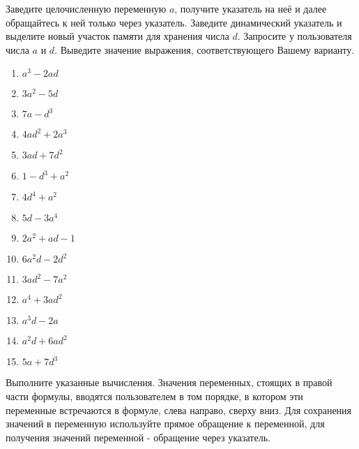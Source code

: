 
\labtask

Заведите целочисленную переменную $a$, получите указатель на неё и далее обращайтесь к ней только через указатель.
Заведите динамический указатель и выделите новый участок памяти для хранения числа $d$.
Запросите у пользователя числа $a$ и $d$.
Выведите значение выражения, соответствующего Вашему варианту.

\begin{enumerate}

\item $a^3-2ad$

\item $3a^2-5d$

\item  $7a-d^3$

\item  $4ad^2+2a^3$

\item  $3ad+7d^2$

\item  $1-d^3+a^2$

\item  $4d^4+a^2$

\item  $5d-3a^4$

\item  $2a^2+ad-1$

\item  $6a^2d-2d^2$

\item  $3ad^2-7a^2$

\item  $a^4+3ad^2$

\item  $a^3d-2a$

\item  $a^2d+6ad^2$

\item  $5a+7d^3$

\end{enumerate}


\labtask

Выполните указанные вычисления.
Значения переменных, стоящих в правой части формулы, вводятся пользователем в том порядке, в котором эти переменные встречаются в формуле, слева направо, сверху вниз.
Для сохранения значений в переменную используйте прямое обращение к переменной, для получения значений переменной - обращение через указатель.


